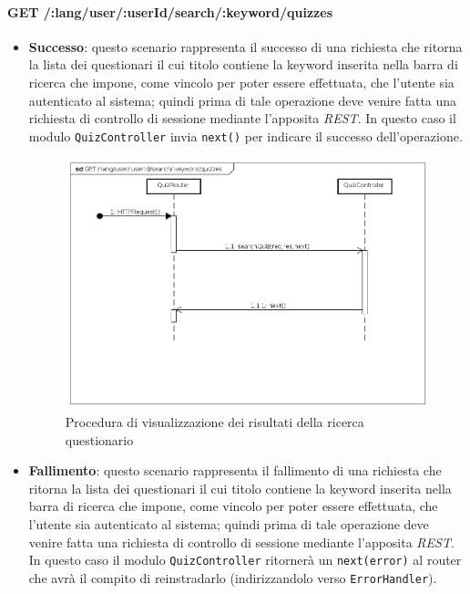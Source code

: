 \paragraph{GET /:lang/user/:userId/search/:keyword/quizzes}
\begin{itemize}
\item \textbf{Successo}: questo scenario rappresenta il successo di una richiesta che ritorna la lista dei questionari il cui titolo contiene la keyword inserita nella barra di ricerca che impone, come vincolo per poter essere effettuata, che l'utente sia autenticato al sistema; quindi prima di tale operazione deve venire fatta una richiesta di controllo di sessione mediante l'apposita \textit{REST}. In questo caso il modulo \texttt{QuizController} invia \texttt{next()} per indicare il successo dell'operazione.

\begin{figure}[ht]
	\centering
	\includegraphics[scale=0.45]{UML/DiagrammiDiSequenza/Back-end/GET__lang_user__userId_search__keyword_quizzes_success.png}
	\caption{Procedura di visualizzazione dei risultati della ricerca questionario}
\end{figure}
\FloatBarrier

\item \textbf{Fallimento}: questo scenario rappresenta il fallimento di una richiesta che ritorna la lista dei questionari il cui titolo contiene la keyword inserita nella barra di ricerca che impone, come vincolo per poter essere effettuata, che l'utente sia autenticato al sistema; quindi prima di tale operazione deve venire fatta una richiesta di controllo di sessione mediante l'apposita \textit{REST}. In questo caso il modulo \texttt{QuizController} ritornerà un \texttt{next(error)} al router che avrà il compito di reinstradarlo (indirizzandolo verso \texttt{ErrorHandler}).


\end{itemize}
